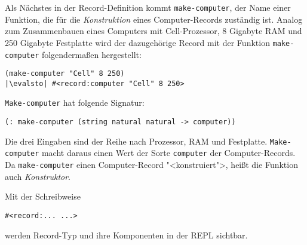 Als Nächstes in der Record-Definition kommt \lstinline{make-computer},
der Name einer Funktion, die für die \textit{Konstruktion} eines
Computer-Records zuständig ist.  Analog zum Zusammenbauen eines
Computers mit Cell-Prozessor, 8 Gigabyte RAM und 250 Gigabyte
Festplatte wird der dazugehörige Record mit der Funktion
\lstinline{make-computer} folgendermaßen hergestellt:
%
\begin{lstlisting}
(make-computer "Cell" 8 250)
|\evalsto| #<record:computer "Cell" 8 250>
\end{lstlisting}
%
\lstinline{Make-computer} hat folgende Signatur:
%
\begin{lstlisting}
(: make-computer (string natural natural -> computer))
\end{lstlisting}
%
Die drei Eingaben sind der Reihe nach Prozessor, RAM und Festplatte.
\lstinline{Make-computer} macht daraus einen Wert der Sorte
\lstinline{computer} der Computer-Records.  Da \lstinline{make-computer}
einen Computer-Record "<konstruiert">, heißt die Funktion auch
\textit{Konstruktor}.

Mit der Schreibweise
%
\begin{lstlisting}
#<record:... ...>
\end{lstlisting}
%
werden Record-Typ und ihre Komponenten in der REPL sichtbar.

